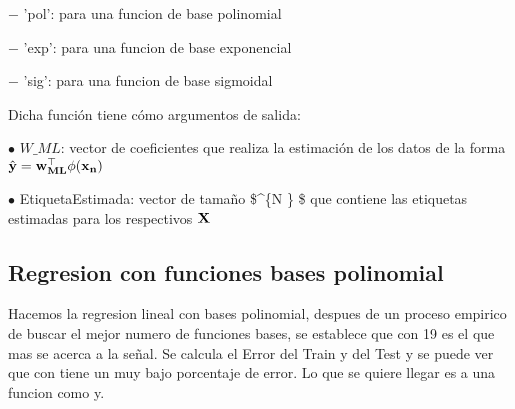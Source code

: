 \documentclass[11pt]{article}
\begin{document}
\(-\) 'pol': para una funcion de base polinomial

\(-\) 'exp': para una funcion de base exponencial

\(-\) 'sig': para una funcion de base sigmoidal

Dicha función tiene cómo argumentos de salida:

\(\bullet\) \(W\_ML\): vector de coeficientes que realiza la estimación
de los datos de la forma
\(\hat{\bf{y}} = \bf{w}_{ML}^\top \phi(\bf{x}_n)\)

\(\bullet\) EtiquetaEstimada: vector de tamaño \$\^{}\{N
\} \$ que contiene las etiquetas estimadas para los respectivos
\(\bf X\)

    \subsection{Regresion con funciones bases
polinomial}\label{regresion-con-funciones-bases-polinomial}

Hacemos la regresion lineal con bases polinomial, despues de un proceso
empirico de buscar el mejor numero de funciones bases, se establece que
con 19 es el que mas se acerca a la señal. Se calcula el Error del Train
y del Test y se puede ver que con tiene un muy bajo porcentaje de error.
Lo que se quiere llegar es a una funcion como y.
\end{document}
